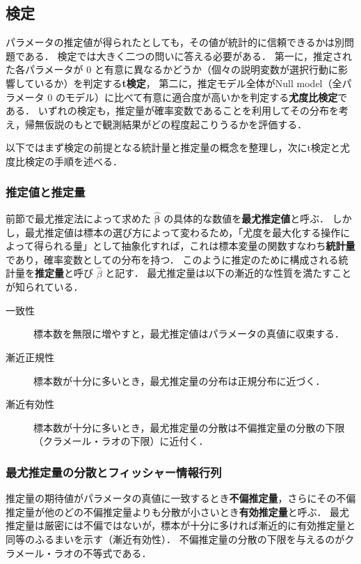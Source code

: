 \subsection{検定}\label{ch:testing}
パラメータの推定値が得られたとしても，その値が統計的に信頼できるかは別問題である．
検定では大きく二つの問いに答える必要がある．
第一に，推定された各パラメータが $0$ と有意に異なるかどうか（個々の説明変数が選択行動に影響しているか）を判定する\textbf{t検定}，
第二に，推定モデル全体がNull model（全パラメータ $0$ のモデル）に比べて有意に適合度が高いかを判定する\textbf{尤度比検定}である．
いずれの検定も，推定量が確率変数であることを利用してその分布を考え，帰無仮説のもとで観測結果がどの程度起こりうるかを評価する．

以下ではまず検定の前提となる統計量と推定量の概念を整理し，次にt検定と尤度比検定の手順を述べる．

\subsubsection{推定値と推定量}\label{ssec:estimator}
前節で最尤推定法によって求めた $\hat{\bm\beta}$ の具体的な数値を\textbf{最尤推定値}と呼ぶ．
しかし，最尤推定値は標本の選び方によって変わるため，「尤度を最大化する操作によって得られる量」として抽象化すれば，これは標本変量の関数すなわち\textbf{統計量}であり，確率変数としての分布を持つ．
このように推定のために構成される統計量を\textbf{推定量}と呼び $\hat\beta$ と記す．
最尤推定量は以下の漸近的な性質を満たすことが知られている．
\begin{description}
    \item[一致性] 標本数を無限に増やすと，最尤推定値はパラメータの真値に収束する．
    \item[漸近正規性] 標本数が十分に多いとき，最尤推定量の分布は正規分布に近づく．
    \item[漸近有効性] 標本数が十分に多いとき，最尤推定量の分散は不偏推定量の分散の下限（クラメール・ラオの下限）に近付く．
\end{description}

\subsubsection{最尤推定量の分散とフィッシャー情報行列}\label{ssec:variance_estimator}
推定量の期待値がパラメータの真値に一致するとき\textbf{不偏推定量}，さらにその不偏推定量が他のどの不偏推定量よりも分散が小さいとき\textbf{有効推定量}と呼ぶ．
最尤推定量は厳密には不偏ではないが，標本が十分に多ければ漸近的に有効推定量と同等のふるまいを示す（漸近有効性）．
不偏推定量の分散の下限を与えるのがクラメール・ラオの不等式である．

